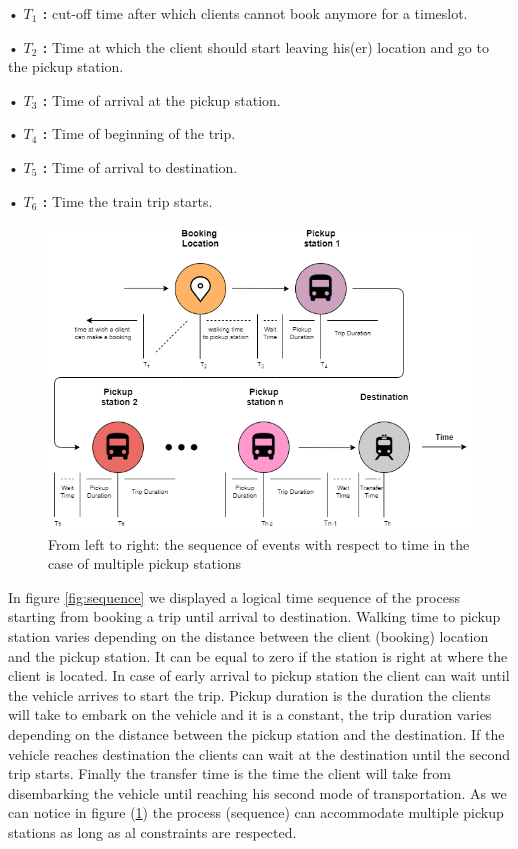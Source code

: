 \documentclass{article}
\begin{document}
\begin{list}{}
\item • \textbf{$T_{1}$ :} cut-off time after which clients cannot book anymore for a timeslot.
\item • \textbf{$T_{2}$ :} Time at which the client should start leaving his(er) location and go to the pickup station.
\item • \textbf{$T_{3}$ :} Time of arrival at the pickup station.
\item • \textbf{$T_{4}$ :} Time of beginning of the trip.
\item • \textbf{$T_{5}$ :} Time of arrival to destination.
\item • \textbf{$T_{6}$ :} Time the train trip starts.
\end{list} 

\begin{figure}[H]
    \centering 
  \includegraphics[width=\linewidth]{pictures/time_sequence_with_manystations}
  \caption{From left to right: the sequence of events with respect to time in the case of multiple pickup stations}
\label{fig:sequence2}
\end{figure}

In figure \ref{fig:sequence} we displayed a logical time sequence of the process starting from booking a trip until arrival to destination. Walking time to pickup station varies depending on the distance between the client (booking) location and the 
pickup station. It can be equal to zero if the station is right at where the client is located. In case of early arrival to pickup station the client can wait until the vehicle arrives to start the trip. Pickup duration is the duration the clients will take to embark 
on the vehicle and it is a constant, the trip duration varies depending on the distance between the pickup station and the destination. If the vehicle reaches destination the clients can wait at the destination until the second trip starts. Finally the transfer time 
is the time the client will take from disembarking the vehicle until reaching his second mode of transportation. As we can notice in figure (\ref{fig:sequence2}) the process (sequence) can accommodate multiple pickup stations as long as al constraints are respected.
\end{document}
